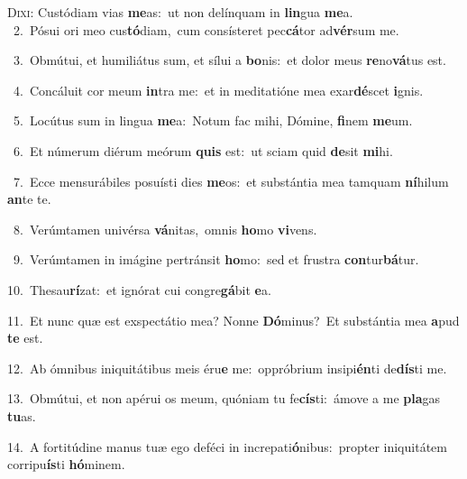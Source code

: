 \lettrine{\initial\textcolor{\initialcolor}{D}}{ixi:} Custódiam vias \textbf{me}\-as:~\star ut non delínquam in \textbf{lin}\-gua \textbf{me}\-a.\\
{\numbfont\textcolor{\numbcolor}{~2.}}~Pósui ori meo cus\-\textbf{tó}\-diam,~\star cum consísteret pec\-\textbf{cá}\-tor ad\-\textbf{vér}\-sum me.\par
{\numbfont\textcolor{\numbcolor}{~3.}}~Obmútui, et humiliátus sum, et sílui a \textbf{bo}\-nis:~\star et dolor meus \textbf{re}\-no\-\textbf{vá}\-tus est.\par
{\numbfont\textcolor{\numbcolor}{~4.}}~Concáluit cor meum \textbf{in}\-tra me:~\star et in meditatióne mea exar\-\textbf{dé}\-scet \textbf{i}\-gnis.\par
{\numbfont\textcolor{\numbcolor}{~5.}}~Locútus sum in lingua \textbf{me}\-a:~\star Notum fac mihi, Dómine, \textbf{fi}\-nem \textbf{me}\-um.\par
{\numbfont\textcolor{\numbcolor}{~6.}}~Et númerum diérum meórum \textbf{quis} est:~\star ut sciam quid \textbf{de}\-sit \textbf{mi}\-hi.\par
{\numbfont\textcolor{\numbcolor}{~7.}}~Ecce mensurábiles posuísti dies \textbf{me}\-os:~\star et substántia mea tamquam \textbf{ní}\-hilum \textbf{an}\-te te.\par
{\numbfont\textcolor{\numbcolor}{~8.}}~Verúmtamen univérsa \textbf{vá}\-nitas,~\star omnis \textbf{ho}\-mo \textbf{vi}\-vens.\par
{\numbfont\textcolor{\numbcolor}{~9.}}~Verúmtamen in imágine pertránsit \textbf{ho}\-mo:~\star sed et frustra \textbf{con}\-tur\-\textbf{bá}\-tur.\par
{\numbfont\textcolor{\numbcolor}{10.}}~Thesau\-\textbf{rí}\-zat:~\star et ignórat cui congre\-\textbf{gá}\-bit \textbf{e}\-a.\par
{\numbfont\textcolor{\numbcolor}{11.}}~Et nunc quæ est exspectátio mea? Nonne \textbf{Dó}\-minus?~\star Et substántia mea \textbf{a}\-pud \textbf{te} est.\par
{\numbfont\textcolor{\numbcolor}{12.}}~Ab ómnibus iniquitátibus meis éru\textbf{e} me:~\star oppróbrium insipi\-\textbf{én}\-ti de\-\textbf{dís}\-ti me.\par
{\numbfont\textcolor{\numbcolor}{13.}}~Obmútui, et non apérui os meum, quóniam tu fe\-\textbf{cís}\-ti:~\star ámove a me \textbf{pla}\-gas \textbf{tu}\-as.\par
{\numbfont\textcolor{\numbcolor}{14.}}~A fortitúdine manus tuæ ego deféci in increpati\-\textbf{ó}\-nibus:~\star propter iniquitátem corripu\-\textbf{ís}\-ti \textbf{hó}\-minem.\par

